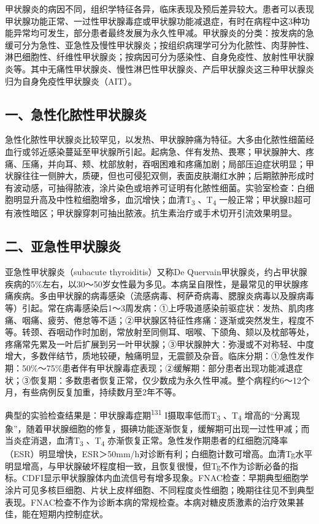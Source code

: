 甲状腺炎的病因不同，组织学特征各异，临床表现及预后差异较大。患者可以表现甲状腺功能正常、一过性甲状腺毒症或甲状腺功能减退症，有时在病程中这3种功能异常均可发生，部分患者最终发展为永久性甲减。甲状腺炎的分类：按发病的急缓可分为急性、亚急性及慢性甲状腺炎；按组织病理学可分为化脓性、肉芽肿性、淋巴细胞性、纤维性甲状腺炎；按病因可分为感染性、自身免疫性、放射性甲状腺炎等。其中无痛性甲状腺炎、慢性淋巴性甲状腺炎、产后甲状腺炎这三种甲状腺炎归为自身免疫性甲状腺炎（AIT）。

\subsection{一、急性化脓性甲状腺炎}

急性化脓性甲状腺炎比较罕见，以发热、甲状腺肿痛为特征。大多由化脓性细菌经血行或邻近感染蔓延至甲状腺所引起。起病急、伴有发热、畏寒；甲状腺肿大、疼痛、压痛，并向耳、颊、枕部放射，吞咽困难和疼痛加剧；局部压迫症状明显；甲状腺往往一侧肿大，质硬，但也可侵犯双侧，表面皮肤潮红水肿；后期脓肿形成时有波动感，可抽得脓液，涂片染色或培养可证明有化脓性细菌。实验室检查：白细胞明显升高及中性粒细胞增多，血沉增快；血清T\textsubscript{3}
、T\textsubscript{4}
一般正常；甲状腺B超可有液性暗区；甲状腺穿刺可抽出脓液。抗生素治疗或手术切开引流效果明显。

\subsection{二、亚急性甲状腺炎}

亚急性甲状腺炎（subacute thyroiditis）又称De
Quervain甲状腺炎，约占甲状腺疾病的5\%左右，以30～50岁女性最为多见。本病呈自限性，是最常见的甲状腺疼痛疾病。多由甲状腺的病毒感染（流感病毒、柯萨奇病毒、腮腺炎病毒以及腺病毒等）引起。常在病毒感染后1～3周发病：①上呼吸道感染前驱症状：发热、肌肉疼痛、咽痛、疲劳、倦怠等不适；②甲状腺区特征性疼痛：逐渐或突然发生，程度不等。转颈、吞咽动作时加剧，常放射至同侧耳、咽喉、下颌角、颏以及枕部等处，疼痛常先累及一叶后扩展到另一叶甲状腺；③甲状腺肿大：弥漫或不对称轻、中度增大，多数伴结节，质地较硬，触痛明显，无震颤及杂音。临床分期：①急性发作期：50\%～75\%患者伴有甲状腺毒症表现；②缓解期：部分患者出现功能减退症状；③恢复期：多数患者恢复正常，仅少数成为永久性甲减。整个病程约6～12个月，有些病例反复加重，持续数月至2年不等。

典型的实验检查结果是：甲状腺毒症期\textsuperscript{131}
I摄取率低而T\textsubscript{3} 、T\textsubscript{4}
增高的“分离现象”，随着甲状腺细胞的修复，摄碘功能逐渐恢复，缓解期可出现一过性甲减；而当炎症消退，血清T\textsubscript{3}
、T\textsubscript{4}
亦渐恢复正常。急性发作期患者的红细胞沉降率（ESR）明显增快，ESR＞50mm/h对诊断有利；白细胞计数可增高。血清Tg水平明显增高，与甲状腺破坏程度相一致，且恢复很慢，但Tg不作为诊断必备的指标。CDFI显示甲状腺腺体内血流信号有增多现象。FNAC检查：早期典型细胞学涂片可见多核巨细胞、片状上皮样细胞、不同程度炎性细胞；晚期往往见不到典型表现。FNAC检查不作为诊断本病的常规检查。本病对糖皮质激素的治疗效果甚佳，能在短期内控制症状。

